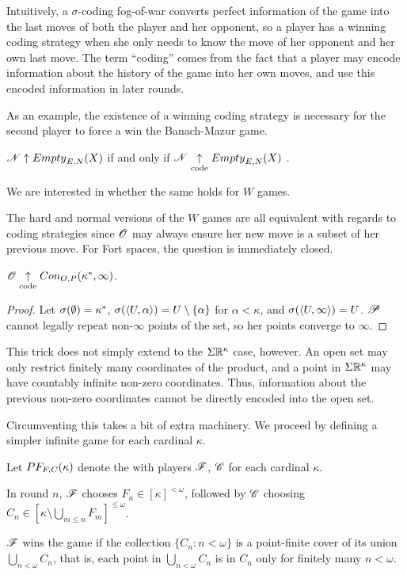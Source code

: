 Intuitively, a $\sigma$-coding fog-of-war converts perfect information of the
game into the last moves of both the player and her opponent, so a player has
a winning coding strategy when she only needs to know the move of her opponent
and her own last move. The term ``coding'' comes from the fact
that a player may encode information about the history of the game into
her own moves, and use this encoded information in later rounds.

As an example, the existence of a winning coding strategy is necessary for the
second player to force a win the Banach-Mazur game.

\begin{thm}\label{bmcode}
  $\mathscr{N}\uparrow{Empty}_{E,N}(X)$ if and only if $\mathscr{N}\underset{\text{code}}{\uparrow}{Empty}_{E,N}(X)$
  \cite{MR817083} \cite{MR831181}.
\end{thm}

We are interested in whether the same holds for $W$ games.

The hard and normal versions of the $W$ games are all equivalent with regards
to coding strategies since $\mathscr{O}$
may always ensure her new move is a subset of her previous move. For
Fort spaces, the question is immediately closed.

\begin{prop}
  $\mathscr{O} \underset{\text{code}}{\uparrow} Con_{O,P}(\kappa^*,\infty)$.
\end{prop}

\begin{proof}
  Let $\sigma(\emptyset)=\kappa^*$,
  $\sigma(\langle U,\alpha\rangle)=U\setminus\{\alpha\}$ for $\alpha<\kappa$,
  and $\sigma(\langle U,\infty\rangle)=U$. $\mathscr{P}$
  cannot legally repeat non-$\infty$ points of the set, so her points converge
  to $\infty$.
\end{proof}

This trick does not simply extend to the $\Sigma\mathbb{R}^{\kappa}$ case, however.
An open set may only restrict finitely many coordinates of the product,
and a point in $\Sigma\mathbb{R}^{\kappa}$ may have countably infinite non-zero
coordinates. Thus, information about the previous non-zero coordinates cannot be
directly encoded into the open set.

Circumventing this takes a bit of extra machinery. We proceed by defining
a simpler infinite game for each cardinal $\kappa$.

\begin{game}
  Let $PF_{F,C}(\kappa)$ denote the  with players
  $\mathscr{F}$, $\mathscr{C}$ for each cardinal $\kappa$.

  In round $n$, $\mathscr{F}$ chooses $F_n\in[\kappa]^{<\omega}$, followed by
  $\mathscr{C}$ choosing $C_n\in[\kappa\setminus\bigcup_{m\leq n}F_m]^{\leq\omega}$.

  $\mathscr{F}$ wins the game if the collection $\{C_n:n<\omega\}$ is a point-finite
  cover of its union $\bigcup_{n<\omega} C_n$, that is, each point in
  $\bigcup_{n<\omega} C_n$ is in $C_n$ only for finitely many $n<\omega$.
\end{game}

